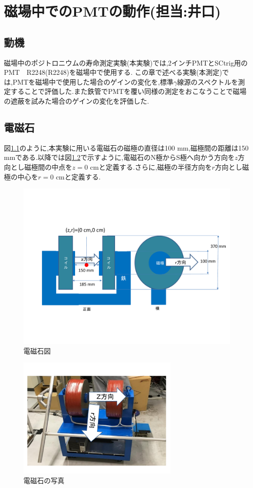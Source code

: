 \chapter{磁場中でのPMTの動作(担当:井口)}\label{PMT}


\section{動機}
磁場中のポジトロニウムの寿命測定実験(本実験)では,2インチPMTとSCtrig用のPMT　R2248(R2248)\cite{pmtR2248}を磁場中で使用する.
この章で述べる実験(本測定)では,PMTを磁場中で使用した場合のゲインの変化を,標準$\gamma$線源のスペクトルを測定することで評価した.また鉄管でPMTを覆い同様の測定をおこなうことで磁場の遮蔽を試みた場合のゲインの変化を評価した.


\section{電磁石}
図\ref{magfigure}のように,本実験に用いる電磁石の磁極の直径は100 mm,磁極間の距離は150 mmである.以降では図\ref{magphoto}で示すように,電磁石のN極からS極へ向かう方向を$z$方向とし磁極間の中点を$z=0$ cmと定義する.さらに,磁極の半径方向を$r$方向とし磁極の中心を$r=0$ cmと定義する.
\begin{figure}[tbp]
	\centering
	\includegraphics[width=13cm]{fig/iguchi/magnetfigure.pdf}
	\caption{電磁石図}
	\label{magfigure}
\end{figure}

\begin{figure}[tbp]
	\centering
	\includegraphics[width=8cm]{fig/iguchi/magnetphoto.pdf}
	\caption{電磁石の写真}
	\label{magphoto}
\end{figure}

